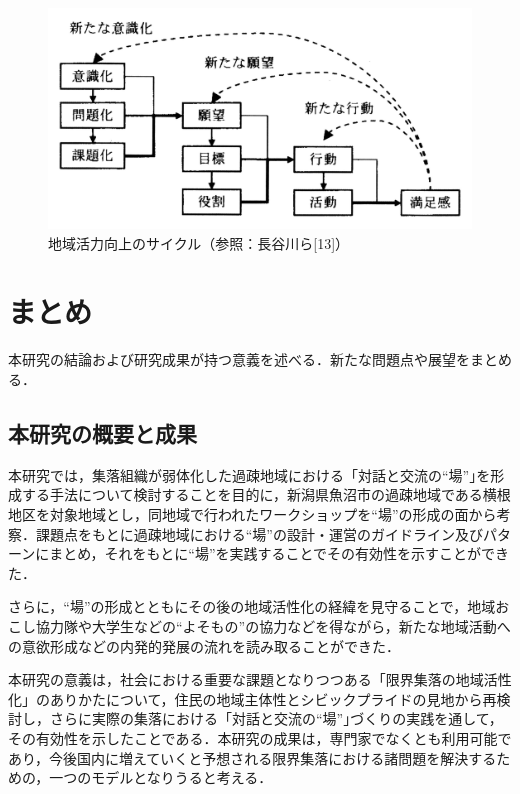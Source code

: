 \documentclass[a4paper]{jsarticle}
\begin{document}
\begin{figure}[H]
  \begin{center}
    \includegraphics[width=1.0\hsize]{./images/16.jpg}
    \caption{地域活力向上のサイクル（参照：長谷川ら[13]）}
    \label{fig:tmu_hino}
  \end{center}
\end{figure}

\newpage
\section{まとめ}
本研究の結論および研究成果が持つ意義を述べる．新たな問題点や展望をまとめる．

\subsection{本研究の概要と成果}

本研究では，集落組織が弱体化した過疎地域における「対話と交流の“場”｣を形成する手法について検討することを目的に，新潟県魚沼市の過疎地域である横根地区を対象地域とし，同地域で行われたワークショップを“場”の形成の面から考察．課題点をもとに過疎地域における“場”の設計・運営のガイドライン及びパターンにまとめ，それをもとに“場”を実践することでその有効性を示すことができた．\par
さらに，“場”の形成とともにその後の地域活性化の経緯を見守ることで，地域おこし協力隊や大学生などの“よそもの”の協力などを得ながら，新たな地域活動への意欲形成などの内発的発展の流れを読み取ることができた．\par
本研究の意義は，社会における重要な課題となりつつある「限界集落の地域活性化」のありかたについて，住民の地域主体性とシビックプライドの見地から再検討し，さらに実際の集落における「対話と交流の“場”｣づくりの実践を通して，その有効性を示したことである．本研究の成果は，専門家でなくとも利用可能であり，今後国内に増えていくと予想される限界集落における諸問題を解決するための，一つのモデルとなりうると考える．
\end{document}
